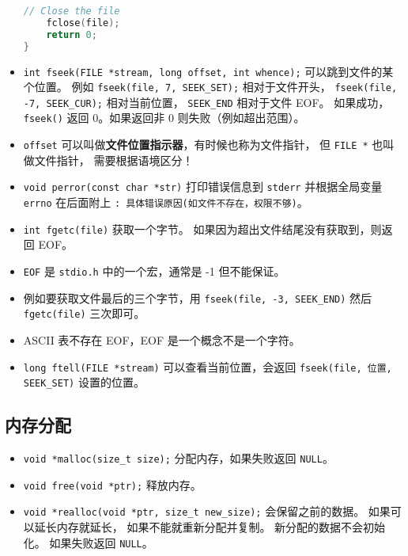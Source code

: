 \begin{itemize}
\begin{lstlisting}[language=cpp]
    // Close the file
    fclose(file);
    return 0;
}
\end{lstlisting}
\item \verb`int fseek(FILE *stream, long offset, int whence);` 可以跳到文件的某个位置。 例如 \verb`fseek(file, 7, SEEK_SET);` 相对于文件开头， \verb`fseek(file, -7, SEEK_CUR);` 相对当前位置， \verb`SEEK_END` 相对于文件 EOF。 如果成功，\verb`fseek()` 返回 0。如果返回非 0 则失败（例如超出范围）。
\item \verb`offset` 可以叫做\textbf{文件位置指示器}，有时候也称为文件指针， 但 \verb`FILE *` 也叫做文件指针， 需要根据语境区分！
\item \verb`void perror(const char *str)` 打印错误信息到 \verb`stderr` 并根据全局变量 \verb`errno` 在后面附上 \verb`: 具体错误原因(如文件不存在，权限不够)`。
\item \verb`int fgetc(file)` 获取一个字节。 如果因为超出文件结尾没有获取到，则返回 EOF。
\item \verb`EOF` 是 \verb`stdio.h` 中的一个宏，通常是 -1 但不能保证。
\item 例如要获取文件最后的三个字节，用 \verb`fseek(file, -3, SEEK_END)` 然后 \verb`fgetc(file)` 三次即可。
\item ASCII 表不存在 EOF，EOF 是一个概念不是一个字符。
\item \verb`long ftell(FILE *stream)` 可以查看当前位置，会返回 \verb`fseek(file, 位置, SEEK_SET)` 设置的位置。
\end{itemize}



\subsection{内存分配}
\begin{itemize}
\item \verb`void *malloc(size_t size);` 分配内存，如果失败返回 \verb`NULL`。
\item \verb`void free(void *ptr);` 释放内存。
\item \verb`void *realloc(void *ptr, size_t new_size);` 会保留之前的数据。 如果可以延长内存就延长， 如果不能就重新分配并复制。 新分配的数据不会初始化。 如果失败返回 \verb`NULL`。
\end{itemize}
